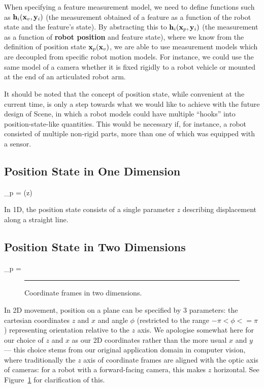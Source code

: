 \documentclass{article}
\begin{document}
When specifying a feature measurement model, we need to define
functions such as ${{\bf h}}_i({{\bf x}}_v, {{\bf y}}_i)$ (the measurement
obtained of a feature as a function of the robot state and the
feature's state). By abstracting this to ${{\bf h}}_i({{\bf x}}_p, {{\bf y}}_i)$
(the measurement as a function of {\bf robot position} and feature
state), where we know from the definition of position state
${{\bf x}}_p({{\bf x}}_v)$, we are able to use measurement models which are
decoupled from specific robot motion models. For instance, we could
use the same model of a camera whether it is fixed rigidly to a robot
vehicle or mounted at the end of an articulated robot arm.


It should be noted that the concept of position state, while
convenient at the current time, is only a step towards what we
would like to achieve with the future design of Scene, in which a
robot models could have multiple ``hooks'' into position-state-like
quantities. This would be necessary if, for instance, a robot
consisted of multiple non-rigid parts, more than one of which was
equipped with a sensor.

\subsection{Position State in One Dimension}

\beq
\vecx_p = (z)
\eeq

In 1D, the position state consists of a single parameter $z$
describing displacement along a straight line.

\subsection{Position State in Two Dimensions}

\beq
\vecx_p = 
\eeq

\begin{figure}[t]
\centerline{
}
\caption{\label{fig:2d}
Coordinate frames in two dimensions.
}
\vspace{2mm} \hrule
\end{figure}

In 2D movement, position on a plane can be specified by 3 parameters:
the cartesian coordinates $z$ and $x$ and angle $\phi$ (restricted to
the range $-\pi < \phi <= \pi$) representing orientation relative to
the $z$ axis. We apologise
somewhat here for our choice of $z$ and $x$ as our 2D coordinates
rather than the more usual $x$ and $y$ --- this choice stems from our
original application domain in computer vision, where traditionally
the $z$ axis of coordinate frames are aligned with the optic axis of
cameras: for a robot with a forward-facing camera, this makes $z$
horizontal. See Figure~\ref{fig:2d} for clarification of this.
\end{document}
